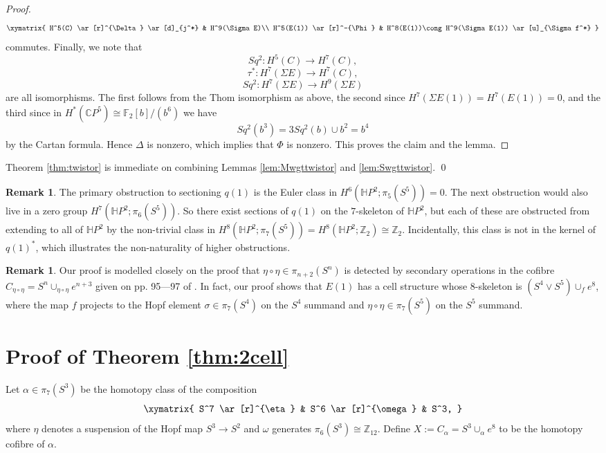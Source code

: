 \documentclass{amsart}
\theoremstyle{plain}
\theoremstyle{definition}
\newtheorem{rem}[thm]{Remark}
\newcommand{\Z}{\mathbb{Z}}
\newcommand{\C}{\mathbb{C}}
\newcommand{\Ha}{\mathbb{H}}
\newcommand{\F}{\mathbb{F}}
\begin{document}
\begin{proof}
 \[
 \xymatrix{
 H^5(C) \ar[r]^{\Delta} \ar[d]_{j^*} & H^9(\Sigma E)\\
 H^5(E(1)) \ar[r]^-{\Phi} & H^8(E(1))\cong H^9(\Sigma E(1)) \ar[u]_{\Sigma f^*}
 }
 \]
 commutes.  Finally, we note that 
 \[
 Sq^2: H^5(C) \to H^7(C),
 \]
 \[
 \tau^*: H^7(\Sigma E)\to H^7(C),
 \]
 \[
 Sq^2: H^7(\Sigma E)\to H^9(\Sigma E)
 \]
 are all isomorphisms. The first follows from the Thom isomorphism as above, the second since $H^7(\Sigma E(1))=H^7(E(1))=0$, and the third since in $H^*(\C P^5)\cong \F_2[b]/(b^6)$ we have 
 \[
 Sq^2(b^3)=3 Sq^2(b)\cup b^2=b^4
 \]
 by the Cartan formula. Hence $\Delta$ is nonzero, which implies that $\Phi$ is nonzero. This proves the claim and the lemma.
 \end{proof}
 
 Theorem \ref{thm:twistor} is immediate on combining Lemmas \ref{lem:Mwgttwistor} and \ref{lem:Swgttwistor}. \qed

\begin{rem}
The primary obstruction to sectioning $q(1)$ is the Euler class in $H^6(\Ha P^2;\pi_5(S^5))=0$. The next obstruction would also live in a zero group $H^7(\Ha P^2;\pi_6(S^5))$. So there exist sections of $q(1)$ on the $7$-skeleton of $\Ha P^2$, but each of these are obstructed from extending to all of $\Ha P^2$ by the non-trivial class in $H^8(\Ha P^2;\pi_7(S^5))=H^8(\Ha P^2;\Z_2)\cong\Z_2$. Incidentally, this class is not in the kernel of $q(1)^*$, which illustrates the non-naturality of higher obstructions.
\end{rem}

\begin{rem}
Our proof is modelled closely on the proof that $\eta\circ \eta\in \pi_{n+2}(S^n)$ is detected by secondary operations in the cofibre $C_{\eta\circ\eta}=S^n\cup_{\eta\circ\eta} e^{n+3}$ given on pp. 95---97 of \cite{Harper}. In fact, our proof shows that $E(1)$ has a cell structure whose $8$-skeleton is $(S^4\vee S^5)\cup_f e^8$, where the map $f$ projects to the Hopf element $\sigma\in \pi_7(S^4)$ on the $S^4$ summand and $\eta\circ\eta\in \pi_7(S^5)$ on the $S^5$ summand.
\end{rem}


    
\section{Proof of Theorem \ref{thm:2cell}}

Let $\alpha\in \pi_7(S^3)$ be the homotopy class of the composition
\[
\xymatrix{
S^7 \ar[r]^{\eta} & S^6 \ar[r]^{\omega} & S^3,
}
\]
where $\eta$ denotes a suspension of the Hopf map $S^3\to S^2$ and $\omega$ generates $\pi_6(S^3)\cong \Z_{12}$. Define $X:=C_\alpha=S^3\cup_\alpha e^8$ to be the homotopy cofibre of $\alpha$.
\end{document}
